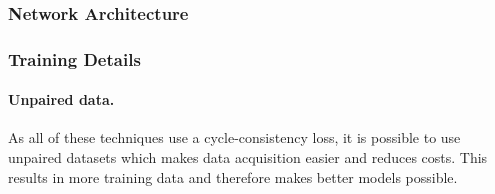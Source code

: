 \subsubsection{Network Architecture}
\subsubsection{Training Details}




\paragraph{Unpaired data.} As all of these techniques use a cycle-consistency loss, it is possible to use unpaired datasets which makes data acquisition easier and reduces costs. This results in more training data and therefore makes better models possible. 